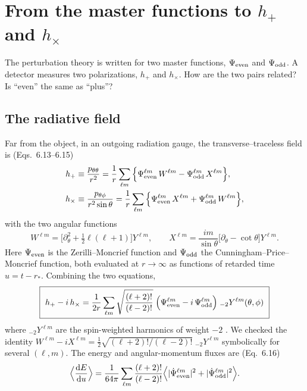\section{From the master functions to $h_+$ and $h_\times$}\label{sec:pol}
\begin{question}
The perturbation theory is written for two master functions, $\Psi_{\rm even}$ and $\Psi_{\rm odd}$. A detector measures two
polarizations, $h_+$ and $h_\times$. How are the two pairs related? Is ``even'' the same as ``plus''?
\end{question}

\subsection{The radiative field}
Far from the object, in an outgoing radiation gauge, the transverse--traceless field is \cite{MP05} (Eqs.~6.13--6.15)
\begin{align}
h_+&\equiv\frac{p_{\theta\theta}}{r^2}=\frac1r\sum_{\ell m}\Big\{\Psi^{\ell m}_{\rm even}\,W^{\ell m}-\Psi^{\ell m}_{\rm odd}\,X^{\ell m}\Big\},
\label{eq:hplus}\\
h_\times&\equiv\frac{p_{\theta\phi}}{r^2\sin\theta}=\frac1r\sum_{\ell m}\Big\{\Psi^{\ell m}_{\rm even}\,X^{\ell m}+\Psi^{\ell m}_{\rm odd}\,W^{\ell m}\Big\},
\label{eq:hcross}
\end{align}
with the two angular functions
\begin{equation}
W^{\ell m}=\Big[\partial_\theta^2+\tfrac12\ell(\ell+1)\Big]Y^{\ell m},\qquad
X^{\ell m}=\frac{im}{\sin\theta}\Big[\partial_\theta-\cot\theta\Big]Y^{\ell m}.
\end{equation}
Here $\Psi_{\rm even}$ is the Zerilli--Moncrief function and $\Psi_{\rm odd}$ the Cunningham--Price--Moncrief function,
both evaluated at $r\to\infty$ as functions of retarded time $u=t-r_*$. Combining the two equations,
\begin{equation}
\boxed{\ h_+-i\,h_\times=\frac1{2r}\sum_{\ell m}\sqrt{\frac{(\ell+2)!}{(\ell-2)!}}\;\Big(\Psi^{\ell m}_{\rm even}-i\,\Psi^{\ell m}_{\rm odd}\Big)\;{}_{-2}Y^{\ell m}(\theta,\phi)\ }
\label{eq:spin}
\end{equation}
where ${}_{-2}Y^{\ell m}$ are the spin-weighted harmonics of weight $-2$ \cite{Goldberg67}. We checked the identity
$W^{\ell m}-iX^{\ell m}=\tfrac12\sqrt{(\ell+2)!/(\ell-2)!}\;{}_{-2}Y^{\ell m}$ symbolically for several $(\ell,m)$.
The energy and angular-momentum fluxes are \cite{MP05} (Eq.~6.16)
\begin{equation}
\Big\langle\frac{\mathrm{d} E}{\mathrm{d} u}\Big\rangle=\frac1{64\pi}\sum_{\ell m}\frac{(\ell+2)!}{(\ell-2)!}\Big\langle|\dot\Psi^{\ell m}_{\rm even}|^2+|\dot\Psi^{\ell m}_{\rm odd}|^2\Big\rangle .
\label{eq:flux}
\end{equation}

